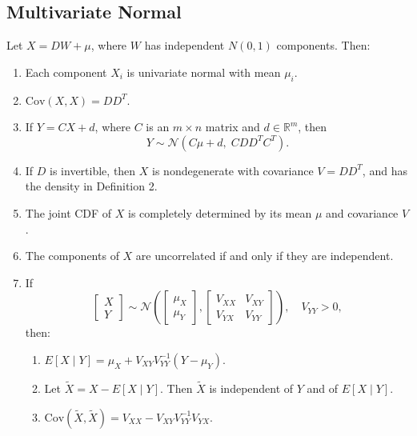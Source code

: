 \documentclass{article}
\begin{document}
\subsection{Multivariate Normal}
\begin{theorem}
Let $X = D W + \mu$, where $W$ has independent $N(0,1)$ components.
Then:
\begin{enumerate}
    \item Each component $X_i$ is univariate normal with mean $\mu_i$.
    \item $\mathrm{Cov}(X, X) = D D^T$.
    \item If $Y = C X + d$, where $C$ is an $m \times n$ matrix and $d \in \mathbb{R}^m$, then
    \[
        Y \sim \mathcal{N}(C\mu + d, \; C D D^T C^T).
    \]
    \item If $D$ is invertible, then $X$ is nondegenerate with covariance $V = D D^T$,
    and has the density in Definition 2.
    \item The joint CDF of $X$ is completely determined by its mean $\mu$ and covariance $V$.
    \item The components of $X$ are uncorrelated if and only if they are independent.
    \item If
    \[
    \begin{bmatrix} X \\ Y \end{bmatrix}
    \sim \mathcal{N} \left(
    \begin{bmatrix} \mu_X \\ \mu_Y \end{bmatrix},
    \begin{bmatrix}
        V_{XX} & V_{XY} \\
        V_{YX} & V_{YY}
    \end{bmatrix}
    \right),
    \quad V_{YY} > 0,
    \]
    then:
    \begin{enumerate}
        \item $E[X \mid Y] = \mu_X + V_{XY} V_{YY}^{-1} (Y - \mu_Y)$.
        \item Let $\tilde{X} = X - E[X \mid Y]$. Then $\tilde{X}$ is independent of $Y$ and of $E[X \mid Y]$.
        \item $\mathrm{Cov}(\tilde{X}, \tilde{X}) = V_{XX} - V_{XY} V_{YY}^{-1} V_{YX}$.
    \end{enumerate}
\end{enumerate}
\end{theorem}
\end{document}
